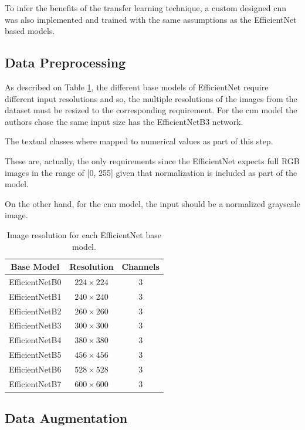 \documentclass[conference]{IEEEtran}
\begin{document}
To infer the benefits of the transfer learning technique, a custom designed \gls{cnn} was also implemented and trained with the same assumptions as the EfficientNet based models.

\subsection{Data Preprocessing}

As described on Table \ref{tab:efficientnet_resolutions}, the different base models of EfficientNet require different input resolutions and so, the multiple resolutions of the images from the dataset must be resized to the corresponding requirement. For the \gls{cnn} model the authors chose the same input size has the EfficientNetB3 network.

The textual classes where mapped to numerical values as part of this step.

These are, actually, the only requirements since the EfficientNet expects full RGB images in the range of [0, 255] given that normalization is included as part of the model.

On the other hand, for the \gls{cnn} model, the input should be a normalized grayscale image.

\begin{table}[htp]
\centering
\caption{Image resolution for each EfficientNet base model.}
\label{tab:efficientnet_resolutions}
\begin{tabular}{ccc}
Base Model     & Resolution     & Channels \\ \hline
EfficientNetB0 & $224 \times 224$ & 3        \\
EfficientNetB1 & $240 \times 240$ & 3        \\
EfficientNetB2 & $260 \times 260$ & 3        \\
EfficientNetB3 & $300 \times 300$ & 3        \\
EfficientNetB4 & $380 \times 380$ & 3        \\
EfficientNetB5 & $456 \times 456$ & 3        \\
EfficientNetB6 & $528 \times 528$ & 3        \\
EfficientNetB7 & $600 \times 600$ & 3       
\end{tabular}
\end{table}

\subsection{Data Augmentation}
\end{document}
